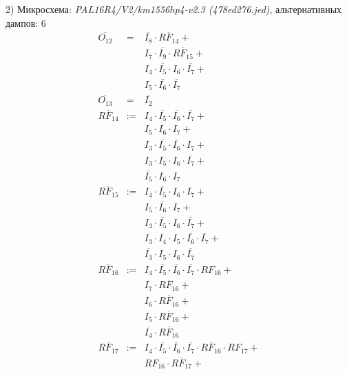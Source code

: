 \documentclass[a4paper,russian]{report}
\begin{document}
2) Микросхема: \emph{PAL16R4/V2/km1556hp4-v2.3  (478ed276.jed)}, альтернативных дампов: 6
\nopagebreak\begin{eqnarray*}
    \overline{O_{12}} & = & \overline{I_{8}} \cdotp \overline{RF_{14}} + \\
	& &  I_{7} \cdotp \overline{I_{9}} \cdotp \overline{RF_{15}} + \\
	& &  I_{4} \cdotp \overline{I_{5}} \cdotp I_{6} \cdotp \overline{I_{7}} + \\
	& &  I_{5} \cdotp \overline{I_{6}} \cdotp \overline{I_{7}} \\
    \overline{O_{13}} & = & \overline{I_{2}} \\
    \overline{RF_{14}} & := & I_{4} \cdotp \overline{I_{5}} \cdotp \overline{I_{6}} \cdotp \overline{I_{7}} + \\
	& &  I_{5} \cdotp I_{6} \cdotp I_{7} + \\
	& &  I_{3} \cdotp \overline{I_{5}} \cdotp \overline{I_{6}} \cdotp I_{7} + \\
	& &  I_{3} \cdotp I_{5} \cdotp I_{6} \cdotp \overline{I_{7}} + \\
	& &  \overline{I_{5}} \cdotp I_{6} \cdotp I_{7} \\
    \overline{RF_{15}} & := & I_{4} \cdotp \overline{I_{5}} \cdotp I_{6} \cdotp I_{7} + \\
	& &  I_{5} \cdotp \overline{I_{6}} \cdotp I_{7} + \\
	& &  I_{3} \cdotp \overline{I_{5}} \cdotp I_{6} \cdotp \overline{I_{7}} + \\
	& &  I_{3} \cdotp I_{4} \cdotp I_{5} \cdotp \overline{I_{6}} \cdotp \overline{I_{7}} + \\
	& &  \overline{I_{3}} \cdotp I_{5} \cdotp I_{6} \cdotp \overline{I_{7}} \\
    \overline{RF_{16}} & := & I_{4} \cdotp \overline{I_{5}} \cdotp \overline{I_{6}} \cdotp \overline{I_{7}} \cdotp RF_{16} + \\
	& &  I_{7} \cdotp \overline{RF_{16}} + \\
	& &  I_{6} \cdotp \overline{RF_{16}} + \\
	& &  I_{5} \cdotp \overline{RF_{16}} + \\
	& &  \overline{I_{4}} \cdotp \overline{RF_{16}} \\
    \overline{RF_{17}} & := & I_{4} \cdotp \overline{I_{5}} \cdotp \overline{I_{6}} \cdotp \overline{I_{7}} \cdotp \overline{RF_{16}} \cdotp RF_{17} + \\
	& &  RF_{16} \cdotp \overline{RF_{17}} + \\

\end{eqnarray*}
\end{document}
